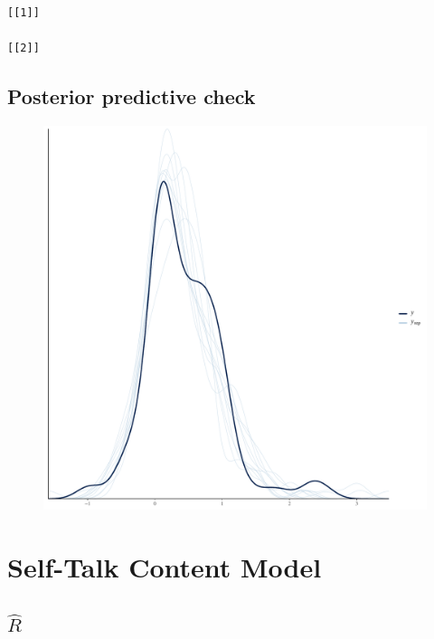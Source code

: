 \documentclass[
]{report}
\begin{document}
\begin{verbatim}
[[1]]

[[2]]
\end{verbatim}

\hypertarget{posterior-predictive-check-2}{%
\section{Posterior predictive
check}\label{posterior-predictive-check-2}}

\begin{figure}

{\centering \includegraphics[width=1\textwidth,height=\textheight]{diagnostic_plots_files/figure-pdf/unnamed-chunk-9-1.pdf}

}

\end{figure}

\hypertarget{self-talk-content-model}{%
\chapter{Self-Talk Content Model}\label{self-talk-content-model}}

\hypertarget{hatr-3}{%
\section{\texorpdfstring{\(\hat{R}\)}{\textbackslash hat\{R\}}}\label{hatr-3}}
\end{document}
